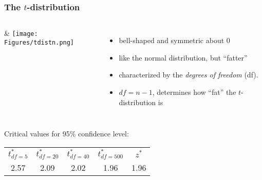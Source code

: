 \begin{frame}
\frametitle{The $t$-distribution}
\begin{columns}
&
\texttt{[image: Figures/tdistn.png]}
\begin{itemize}
    \item
    bell-shaped and symmetric about 0
    \item
    like the normal distribution, but ``fatter''
    \item
    characterized by the \emph{degrees of freedom} (df).
    \item
    $df=n-1$, determines how ``fat'' the $t$-distribution is
\end{itemize}
\end{columns}
\vskip15pt
\begin{center}
Critical values for 95\% confidence level:
\begin{tabular}{|ccccc|}
\hline
$t^*_{df=5}$ & $t^*_{df=20}$ & $t^*_{df=40}$ & $t^*_{df=500}$ & $z^*$ \\
2.57 & 2.09 & 2.02 & 1.96 & 1.96 \\
\hline
\end{tabular}
\end{center}
\end{frame}

%






